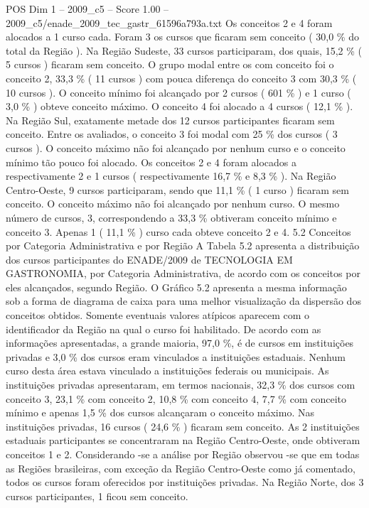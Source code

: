 \begin{textsample}{POS Dim 1 – 2009\_c5 – Score 1.00 – 2009\_c5/enade\_2009\_tec\_gastr\_61596a793a.txt}
Os conceitos 2 e 4 foram alocados a 1 curso cada.
Foram 3 os cursos que ficaram sem conceito ( 30,0 \% do total da Região ).
Na Região Sudeste, 33 cursos participaram, dos quais, 15,2 \% ( 5 cursos ) ficaram sem conceito.
O grupo modal entre os com conceito foi o conceito 2, 33,3 \% ( 11 cursos ) com pouca diferença do conceito 3 com 30,3 \% ( 10 cursos ).
O conceito mínimo foi alcançado por 2 cursos ( 601 \% ) e 1 curso ( 3,0 \% ) obteve conceito máximo.
O conceito 4 foi alocado a 4 cursos ( 12,1 \% ).
Na Região Sul, exatamente metade dos 12 cursos participantes ficaram sem conceito.
Entre os avaliados, o conceito 3 foi modal com 25 \% dos cursos ( 3 cursos ).
O conceito máximo não foi alcançado por nenhum curso e o conceito mínimo tão pouco foi alocado.
Os conceitos 2 e 4 foram alocados a respectivamente 2 e 1 cursos ( respectivamente 16,7 \% e 8,3 \% ).
Na Região Centro-Oeste, 9 cursos participaram, sendo que 11,1 \% ( 1 curso ) ficaram sem conceito.
O conceito máximo não foi alcançado por nenhum curso.
O mesmo número de cursos, 3, correspondendo a 33,3 \% obtiveram conceito mínimo e conceito 3.
Apenas 1 ( 11,1 \% ) curso cada obteve conceito 2 e 4. 5.2 Conceitos por Categoria Administrativa e por Região A Tabela 5.2 apresenta a distribuição dos cursos participantes do ENADE/2009 de TECNOLOGIA EM GASTRONOMIA, por Categoria Administrativa, de acordo com os conceitos por eles alcançados, segundo Região.
O Gráfico 5.2 apresenta a mesma informação sob a forma de diagrama de caixa para uma melhor visualização da dispersão dos conceitos obtidos.
Somente eventuais valores atípicos aparecem com o identificador da Região na qual o curso foi habilitado.
De acordo com as informações apresentadas, a grande maioria, 97,0 \%, é de cursos em instituições privadas e 3,0 \% dos cursos eram vinculados a instituições estaduais.
Nenhum curso desta área estava vinculado a instituições federais ou municipais.
As instituições privadas apresentaram, em termos nacionais, 32,3 \% dos cursos com conceito 3, 23,1 \% com conceito 2, 10,8 \% com conceito 4, 7,7 \% com conceito mínimo e apenas 1,5 \% dos cursos alcançaram o conceito máximo.
Nas instituições privadas, 16 cursos ( 24,6 \% ) ficaram sem conceito.
As 2 instituições estaduais participantes se concentraram na Região Centro-Oeste, onde obtiveram conceitos 1 e 2.
Considerando -se a análise por Região observou -se que em todas as Regiões brasileiras, com exceção da Região Centro-Oeste como já comentado, todos os cursos foram oferecidos por instituições privadas.
Na Região Norte, dos 3 cursos participantes, 1 ficou sem conceito.

\end{textsample}
